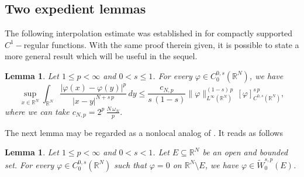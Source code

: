 \documentclass{amsart}
\newtheorem{lemma}[theorem]{Lemma}
\theoremstyle{definition}
\numberwithin{equation}{section}
\begin{document}
	\subsection{Two expedient lemmas}
	The following interpolation estimate was established in \cite[Lemma 2.6]{BBZ} for compactly supported $C^1-$regular functions. With the same proof therein given, it is possible to state a more general result which will be useful in the sequel.   
	\begin{lemma} \label{leibniz-holder}
		Let $1 \le p < \infty$ and $0< s \le 1$. For every $\varphi \in C^{0,s}_0(\mathbb{R}^N)$, we have
		\[
		\sup_{x \in \mathbb{R}^N} \int_{\mathbb{R}^N} \frac{|\varphi(x) - \varphi(y)|^p}{|x-y|^{N+s\,p}}\,dy \le \frac{c_{N,p}}{s\,(1-s)} \|\varphi\|^{(1-s)\,p}_{L^\infty(\mathbb{R}^N)}\,[\varphi]^{s\,p}_{C^{0,s}(\mathbb{R}^N)}, 
		\]
		where we can take $c_{N,p} = 2^p\,\frac{N\,\omega_N}{p}.$
	\end{lemma}

	The next lemma may be regarded as a nonlocal analog of \cite[Theorem 9.17]{Bre}. It reads as follows
	\begin{lemma} \label{lm:brezis-type}
		Let $1 \le p < \infty$ and $0 < s < 1$. Let $E \subseteq \mathbb{R}^N$ be an open and bounded set. For every $\varphi \in C^{0,s}_0(\mathbb{R}^N)$ such that $\varphi = 0$ on $\mathbb{R}^N \setminus E$, we have $\varphi \in \widetilde{W}^{s,p}_0(E)$. 
	\end{lemma}
\end{document}
